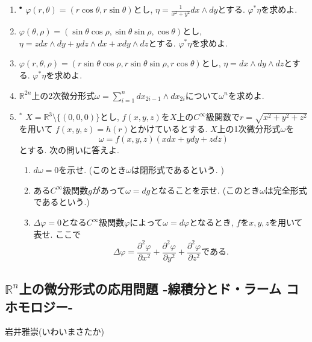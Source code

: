 \documentclass[dvipdfmx,a4paper,11pt]{article}
\newcommand{\R}{\mathbb{R}}
\theoremstyle{definition}
\newcommand{\pdrv}[2]{\frac{\partial #1}{\partial #2}}
\begin{document}
\begin{enumerate}[label=\textbf{問}\ref*{sec-Rn-diff}.\arabic*]
\item $^{\bullet}$ $\varphi(r, \theta) = (r \cos \theta, r \sin \theta)$とし, $\eta = \frac{1}{x^2 + y^2} dx \wedge dy$とする. 
$\varphi^{*}\eta$を求めよ. 

\item $\varphi( \theta, \rho) = ( \sin \theta \cos \rho, \sin \theta \sin \rho,  \cos \theta)$とし, $\eta = z dx \wedge dy  + y dz \wedge dx + x dy \wedge dz$とする. $\varphi^{*}\eta$を求めよ. 


\item $\varphi(r, \theta, \rho) = (r  \sin \theta \cos \rho, r  \sin \theta \sin \rho, r  \cos \theta)$とし, $\eta = dx \wedge dy \wedge dz$とする. $\varphi^{*}\eta$を求めよ. 

\item $\R^{2n}$上の2次微分形式$\omega = \sum_{i=1}^{n} dx_{2i-1} \wedge dx_{2i}$について$\omega^n$を求めよ.

\item $^{*}$ $X = \R^3 \setminus \{(0,0,0)\}$とし, $f(x,y,z)$を$X$上の$C^{\infty}$級関数で$r = \sqrt{x^2 + y^2 + z^2}$を用いて
$f(x,y,z) = h(r)$とかけているとする.
$X$上の1次微分形式$\omega$を
$$
\omega = f(x,y,z)(x dx + y dy + z dz)
$$
とする. 次の問いに答えよ.
\begin{enumerate}
 \setlength{\parskip}{0cm}
  \setlength{\itemsep}{2pt} 
\item $d\omega =0$を示せ. (このとき$\omega$は閉形式であるという. )
\item ある$C^{\infty}$級関数$g$があって$\omega =dg$となることを示せ. (このとき$\omega$は完全形式であるという.)
\item $\Delta \varphi=0$となる$C^{\infty}$級関数$\varphi$によって$\omega =d\varphi$となるとき, $f$を$x,y,z$を用いて表せ. 
ここで
$$
\Delta \varphi=\pdrv{^2\varphi}{x^{2}}+\pdrv{^2\varphi}{y^{2}}+\pdrv{^2\varphi}{z^{2}}
\text{である.}
$$
\end{enumerate}
\end{enumerate}


\newpage
\begin{center}
\section{$\R^n$上の微分形式の応用問題 -線積分とド・ラーム コホモロジー-}
\label{sec-Rn-diff-ap}
\end{center}
\begin{flushright}
 岩井雅崇(いわいまさたか)
\end{flushright}
\end{document}
